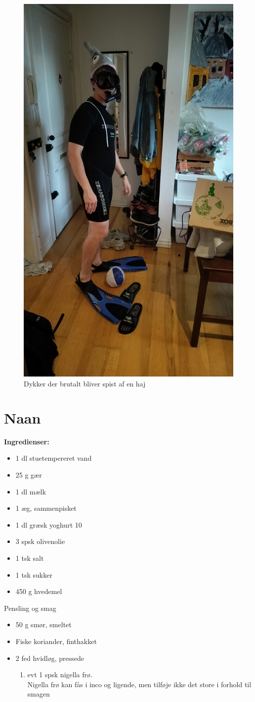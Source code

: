 \documentclass{book}
\begin{document}
\begin{figure}
    \centering
    \includegraphics[width=0.5\linewidth]{Dykke.jpg}
    \caption{Dykker der brutalt bliver spist af en haj}
    
\end{figure}
\newpage \section{Naan}
\begin{minipage}[t]{0.5\textwidth}
\textbf{Ingredienser:}
\begin{itemize}
    \item 1 dl stuetempereret vand
    \item 25 g gær
    \item 1 dl mælk
    \item 1 æg, sammenpisket
    \item 1 dl græsk yoghurt 10 %
    \item 3 spsk olivenolie
    \item1 tsk salt
    \item1 tsk sukker
    \item450 g hvedemel
\end{itemize}
    Pensling og smag
\begin{itemize}
    \item 50 g smør, smeltet
    \item Fiske koriander, finthakket
    \item 2 fed hvidløg, pressede
    \begin{enumerate}
        \item  evt 1 spsk nigella frø. \\
        Nigella frø kan fås i inco og ligende, men tilføje ikke det store i forhold til smagen
    \end{enumerate}
\end{itemize}
\end{minipage}
\end{document}
